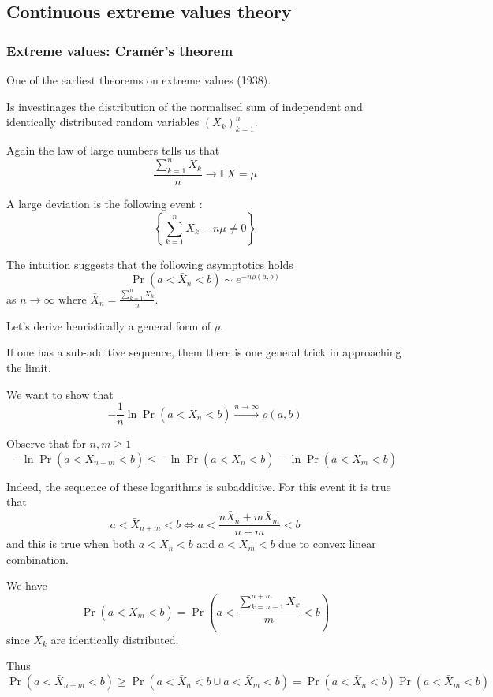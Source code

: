 \documentclass[a4paper]{article}
\newcommand{\obj}[1]{{\left\{ #1 \right \}}}
\newcommand{\brac}[1]{{\left ( #1 \right )}}
\newcommand{\Ex}{\mathbb{E}}
\begin{document}


\subsection{Continuous extreme values theory} %
\label{sub:continuous_extreme_values_theory}

\subsubsection{Extreme values: Cram\'er's theorem} %
\label{ssub:extreme_values_cramer_theorem}

One of the earliest theorems on extreme values (1938).

Is investinages the distribution of the normalised sum of independent and identically distributed random variables $\brac{X_k}_{k=1}^n$.

Again the law of large numbers tells us that
\[\frac{\sum_{k=1}^n X_k}{n} \to \Ex X = \mu\]

A large deviation is the following event :
\[\obj{ \sum_{k=1}^n X_k - n\mu \neq 0 }\]

The intuition suggests that the following asymptotics holds
\[\Pr\brac{a < \bar{X}_n < b} \sim e^{-n \rho(a,b)}\] as $n \to \infty$ where $\bar{X}_n = \frac{\sum_{k=1}^n X_k}{n}$.

Let's derive heuristically a general form of $\rho$.

If one has a sub-additive sequence, them there is one general trick in approaching the limit.

We want to show that 
\[-\frac{1}{n}\ln \Pr(a<\bar{X}_n<b) \overset{n\to\infty}{\to} \rho(a,b)\]

Observe that for $n,m\geq 1$
\[-\ln \Pr(a<\bar{X}_{n+m}<b) \leq - \ln \Pr(a<\bar{X}_n<b) - \ln \Pr(a<\bar{X}_m<b)\]

Indeed, the sequence of these logarithms is subadditive.
For this event it is true that
\[a<\bar{X}_{n+m}<b \Leftrightarrow a<\frac{n \bar{X}_n + m \bar{X}_m}{n+m}<b \]
and this is true when both $a<\bar{X}_n<b$ and $a<\bar{X}_m<b$ due to convex linear combination.

We have 
\[\Pr\brac{a<\bar{X}_m<b} = \Pr\brac{a<\frac{\sum_{k=n+1}^{n+m}X_k}{m}<b}\]
since $X_k$ are identically distributed.

Thus 
\[\Pr\brac{a<\bar{X}_{n+m}<b} \geq \Pr\brac{a<\bar{X}_n<b \cup a<\bar{X}_m<b} = \Pr\brac{a<\bar{X}_n<b}\Pr\brac{a<\bar{X}_m<b} \]
\end{document}
